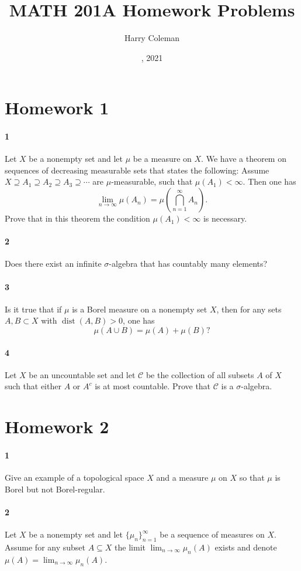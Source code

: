 \documentclass[12pt]{article}
\renewcommand{\maketitle}{\thispagestyle{title}}
\newlength{\myparskip}
\newenvironment{fullbox}{\begin{lrbox}{\savefullbox}\begin{minipage}{\dimexpr\textwidth-2\fboxsep\relax}\setlength{\parskip}{\myparskip}}{\end{minipage}\end{lrbox}\framebox[\textwidth]{\usebox{\savefullbox}}}
\newenvironment{pbox}[1][]{\begin{fullbox}\ifx#1\empty\else\paragraph{#1}\phantom{}\fi}{\end{fullbox}}
\theoremstyle{definition}
\newcommand{\<}{\langle}
\renewcommand{\>}{\rangle}
\DeclareMathOperator{\dist}{dist}
\newcommand{\CC}{\mathcal{C}}
\newcommand{\tbigcap}{{\textstyle\bigcap}}
\begin{document}
\title{MATH 201A Homework Problems}
\author{Harry Coleman}
\date{, 2021}
\maketitle

\section*{Homework 1}

\begin{pbox}[1]
    Let $X$ be a nonempty set and let $\mu$ be a measure on $X$. We have a theorem on sequences of decreasing measurable sets that states the following: Assume $X \supseteq A_1 \supseteq A_2 \supseteq A_3 \supseteq \cdots$ are $\mu$-measurable, such that $\mu(A_1) < \infty$. Then one has
    \[
        \lim_{n\to\infty} \mu(A_n) = \mu(\tbigcap_{n=1}^{\infty} A_n).
    \]
    Prove that in this theorem the condition $\mu(A_1) < \infty$ is necessary.
\end{pbox}

\begin{pbox}[2]
    Does there exist an infinite $\sigma$-algebra that has countably many elements?
\end{pbox}

\begin{pbox}[3]
    Is it true that if $\mu$ is a Borel measure on a nonempty set $X$, then for any sets $A, B \subset X$ with $\dist(A, B) > 0$, one has
    \[
        \mu(A \cup B) = \mu(A) + \mu(B)?
    \]
\end{pbox}

\begin{pbox}[4]
    Let $X$ be an uncountable set and let $\CC$ be the collection of all subsets $A$ of $X$ such that either $A$ or $A^c$ is at most countable. Prove that $\CC$ is a $\sigma$-algebra.
\end{pbox}

\section*{Homework 2}

\begin{pbox}[1]
    Give an example of a topological space $X$ and a measure $\mu$ on $X$ so that $\mu$ is Borel but not Borel-regular.
\end{pbox}

\begin{pbox}[2]
    Let $X$ be a nonempty set and let $\{\mu_n\}_{n=1}^{\infty}$ be a sequence of measures on $X$. Assume for any subset $A \subseteq X$ the limit $\lim_{n \to \infty} \mu_n(A)$ exists and denote $\mu(A) = \lim_{n \to \infty} \mu_n(A)$.
\end{pbox}
\end{document}
